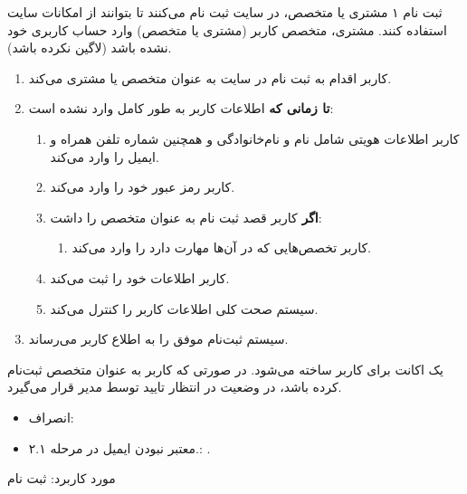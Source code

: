 {
\usecase
{ثبت نام}
{۱}
{مشتری یا متخصص، در سایت ثبت نام می‌کنند تا بتوانند از امکانات سایت استفاده کنند.}
{مشتری، متخصص}
{}{کاربر (مشتری یا متخصص) وارد حساب کاربری خود نشده باشد (لاگین نکرده باشد).}
{
\vspace*{-0.6cm}
\begin{enumerate}
	\item 
	کاربر اقدام به ثبت نام در سایت به عنوان متخصص یا مشتری می‌کند.
	\item
	\textbf{تا زمانی که} اطلاعات کاربر به طور کامل وارد نشده است:
	
	\begin{enumerate}[label=\theenumi.\arabic*.]
	\item
	کاربر اطلاعات هویتی شامل نام و نام‌خانوادگی و همچنین شماره تلفن همراه و ایمیل را وارد می‌کند.
	\item 
	کاربر رمز عبور خود را وارد می‌کند.
	
	\item 
	\textbf{اگر} کاربر قصد ثبت نام به عنوان متخصص را داشت:
	\begin{enumerate}
		\item 
		کاربر تخصص‌هایی که در آن‌ها مهارت دارد را وارد می‌کند.
	\end{enumerate}

	\item 
	کاربر اطلاعات خود را ثبت می‌کند.
	
	\item 
	سیستم صحت کلی اطلاعات کاربر را کنترل می‌کند.
	\end{enumerate}
	
	\item 
	سیستم ثبت‌نام موفق را به اطلاع کاربر می‌رساند.
	
	
\end{enumerate}
}
{یک اکانت برای کاربر ساخته می‌شود. در صورتی که کاربر به عنوان متخصص ثبت‌نام کرده باشد، در وضعیت در انتظار تایید توسط مدیر قرار می‌گیرد.}
{\begin{itemize}
		\vspace*{-0.6cm}
		\item انصراف: 
		\item معتبر نبودن ایمیل در مرحله ۲.۱.: .
		
		
\end{itemize}}
{مورد کاربرد: ثبت نام}


}
